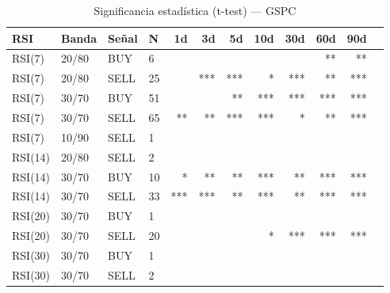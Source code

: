 %
\begin{table}[htbp]
    \centering
    \caption{Significancia estadística (t-test) --- GSPC}
    \label{tab:sig_gspc}
    \small
    \begin{tabular}{llllrrrrrrrr}
        \toprule
        \textbf{RSI} & \textbf{Banda} & \textbf{Se\~{n}al} & \textbf{N} & \textbf{1d} & \textbf{3d} & \textbf{5d} & \textbf{10d} & \textbf{30d} & \textbf{60d} & \textbf{90d} \\
        \midrule
        RSI(7) & 20/80 & BUY & 6 &  &  &  &  &  & ** & ** \\
        RSI(7) & 20/80 & SELL & 25 &  & *** & *** & * & *** & ** & *** \\
        RSI(7) & 30/70 & BUY & 51 &  &  & ** & *** & *** & *** & *** \\
        RSI(7) & 30/70 & SELL & 65 & ** & ** & *** & *** & * & ** & *** \\
        RSI(7) & 10/90 & SELL & 1 &  &  &  &  &  &  &  \\
        \midrule
        RSI(14) & 20/80 & SELL & 2 &  &  &  &  &  &  &  \\
        RSI(14) & 30/70 & BUY & 10 & * & ** & ** & *** & ** & *** & *** \\
        RSI(14) & 30/70 & SELL & 33 & *** & *** & ** & *** & ** & *** & *** \\
        \midrule
        RSI(20) & 30/70 & BUY & 1 &  &  &  &  &  &  &  \\
        RSI(20) & 30/70 & SELL & 20 &  &  &  & * & *** & *** & *** \\
        \midrule
        RSI(30) & 30/70 & BUY & 1 &  &  &  &  &  &  &  \\
        RSI(30) & 30/70 & SELL & 2 &  &  &  &  &  &  &  \\
        \bottomrule
    \end{tabular}
\end{table}
